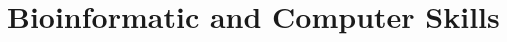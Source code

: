 \documentclass[letterpaper, 10pt]{article}
\newcommand\VRule{\color{lightgray}\vrule width 0.5pt}
\begin{document}


\section*{Bioinformatic and Computer Skills}
\end{document}

